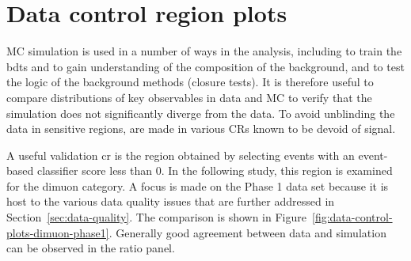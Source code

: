\clearpage
\section{Data control region plots}
\label{sec:data-control-region-plots}

MC simulation is used in a number of ways in the analysis, including to train the \glspl{bdt} and to gain understanding of the composition of the background, and to test the logic of the background methods (closure tests). It is therefore useful to compare distributions of key observables in data and MC to verify that the simulation does not significantly diverge from the data. To avoid unblinding the data in sensitive regions, are made in various CRs known to be devoid of signal. 

A useful validation \gls{cr} is the region obtained by selecting events with an event-based classifier score less than 0. In the following study, this region is examined for the dimuon category. A focus is made on the Phase 1 data set because it is host to the various data quality issues that are further addressed in Section~\ref{sec:data-quality}. The comparison is shown in Figure~\ref{fig:data-control-plots-dimuon-phase1}. Generally good agreement between data and simulation can be observed in the ratio panel.



